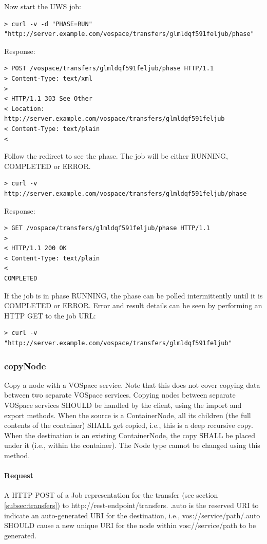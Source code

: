 \documentclass[11pt,a4paper]{ivoa}
\begin{document}
Now start the UWS job:
\begin{lstlisting}
> curl -v -d "PHASE=RUN" "http://server.example.com/vospace/transfers/glmldqf591feljub/phase"
\end{lstlisting}
Response:
\begin{lstlisting}
> POST /vospace/transfers/glmldqf591feljub/phase HTTP/1.1
> Content-Type: text/xml
>
< HTTP/1.1 303 See Other
< Location: http://server.example.com/vospace/transfers/glmldqf591feljub
< Content-Type: text/plain
<
\end{lstlisting}
Follow the redirect to see the phase.  The job will be either RUNNING, COMPLETED or ERROR.
\begin{lstlisting}
> curl -v http://server.example.com/vospace/transfers/glmldqf591feljub/phase
\end{lstlisting}
Response:
\begin{lstlisting}
> GET /vospace/transfers/glmldqf591feljub/phase HTTP/1.1
>
< HTTP/1.1 200 OK
< Content-Type: text/plain
<
COMPLETED
\end{lstlisting}
If the job is in phase RUNNING, the phase can be polled intermittently until it is COMPLETED or ERROR.
Error and result details can be seen by performing an HTTP GET to the job URL:
\begin{lstlisting}
> curl -v "http://server.example.com/vospace/transfers/glmldqf591feljub"
\end{lstlisting}

\subsubsection{copyNode}
\label{subsubsec:copynode}
Copy a node with a VOSpace service.
Note that this does not cover copying data between two separate VOSpace services.
Copying nodes between separate VOSpace services SHOULD be handled by the client, using the import and export methods.
When the source is a ContainerNode, all its children (the full contents of the container) SHALL get copied, i.e., this is a deep recursive copy.
When the destination is an existing ContainerNode, the copy SHALL be placed under it (i.e., within the container).
The Node type cannot be changed using this method.

\paragraph{Request}
A HTTP POST of a Job representation for the transfer (see section \ref{subsec:transfers}) to http://rest-endpoint/transfers.
.auto is the reserved URI to indicate an auto-generated URI for the destination, i.e., vos://service/path/.auto SHOULD cause a new unique URI for the node within vos://service/path to be generated.
\end{document}
